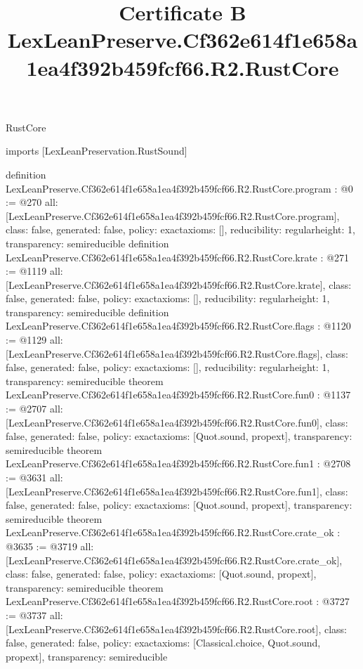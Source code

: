 \begin{lexlean}{RustCore}
\title{Certificate B LexLeanPreserve.Cf362e614f1e658a1ea4f392b459fcf66.R2.RustCore}
\begin{coremodule}
imports [LexLeanPreservation.RustSound]

definition LexLeanPreserve.Cf362e614f1e658a1ea4f392b459fcf66.R2.RustCore.program : @0 := @270 {
  all: [LexLeanPreserve.Cf362e614f1e658a1ea4f392b459fcf66.R2.RustCore.program],
  class: false,
  generated: false,
  policy: exact{axioms: []},
  reducibility: regular{height: 1},
  transparency: semireducible
}
definition LexLeanPreserve.Cf362e614f1e658a1ea4f392b459fcf66.R2.RustCore.krate : @271 := @1119 {
  all: [LexLeanPreserve.Cf362e614f1e658a1ea4f392b459fcf66.R2.RustCore.krate],
  class: false,
  generated: false,
  policy: exact{axioms: []},
  reducibility: regular{height: 1},
  transparency: semireducible
}
definition LexLeanPreserve.Cf362e614f1e658a1ea4f392b459fcf66.R2.RustCore.flags : @1120 := @1129 {
  all: [LexLeanPreserve.Cf362e614f1e658a1ea4f392b459fcf66.R2.RustCore.flags],
  class: false,
  generated: false,
  policy: exact{axioms: []},
  reducibility: regular{height: 1},
  transparency: semireducible
}
theorem LexLeanPreserve.Cf362e614f1e658a1ea4f392b459fcf66.R2.RustCore.fun0 : @1137 := @2707 {
  all: [LexLeanPreserve.Cf362e614f1e658a1ea4f392b459fcf66.R2.RustCore.fun0],
  class: false,
  generated: false,
  policy: exact{axioms: [Quot.sound, propext]},
  transparency: semireducible
}
theorem LexLeanPreserve.Cf362e614f1e658a1ea4f392b459fcf66.R2.RustCore.fun1 : @2708 := @3631 {
  all: [LexLeanPreserve.Cf362e614f1e658a1ea4f392b459fcf66.R2.RustCore.fun1],
  class: false,
  generated: false,
  policy: exact{axioms: [Quot.sound, propext]},
  transparency: semireducible
}
theorem LexLeanPreserve.Cf362e614f1e658a1ea4f392b459fcf66.R2.RustCore.crate_ok : @3635 := @3719 {
  all: [LexLeanPreserve.Cf362e614f1e658a1ea4f392b459fcf66.R2.RustCore.crate_ok],
  class: false,
  generated: false,
  policy: exact{axioms: [Quot.sound, propext]},
  transparency: semireducible
}
theorem LexLeanPreserve.Cf362e614f1e658a1ea4f392b459fcf66.R2.RustCore.root : @3727 := @3737 {
  all: [LexLeanPreserve.Cf362e614f1e658a1ea4f392b459fcf66.R2.RustCore.root],
  class: false,
  generated: false,
  policy: exact{axioms: [Classical.choice, Quot.sound, propext]},
  transparency: semireducible
}


\end{coremodule}
\end{lexlean}
